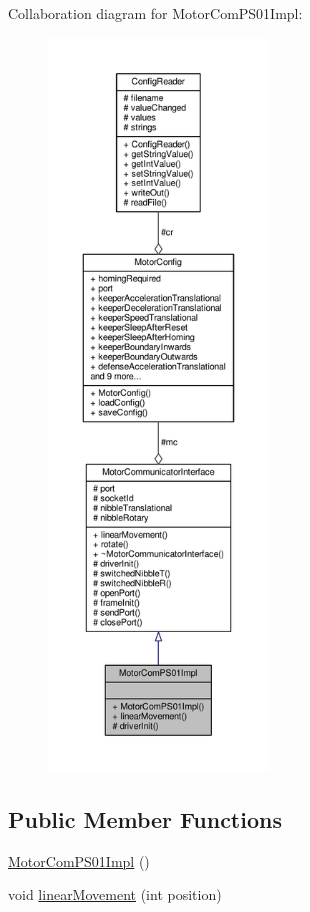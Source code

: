 Collaboration diagram for Motor\+Com\+P\+S01\+Impl\+:\nopagebreak
\begin{figure}[H]
\begin{center}
\leavevmode
\includegraphics[height=550pt]{class_motor_com_p_s01_impl__coll__graph}
\end{center}
\end{figure}
\subsection*{Public Member Functions}
\begin{DoxyCompactItemize}
\item 
\hyperlink{class_motor_com_p_s01_impl_a52dec4461022dee453eeb26ff1072420}{Motor\+Com\+P\+S01\+Impl} ()
\item 
void \hyperlink{class_motor_com_p_s01_impl_ae47ca67174e3240e18e129b5193a1ddc}{linear\+Movement} (int position)
\end{DoxyCompactItemize}
